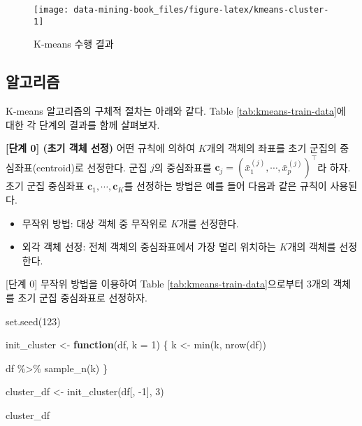\documentclass[
]{book}
\newenvironment{Shaded}{\begin{snugshade}}{\end{snugshade}}
\newcommand{\AttributeTok}[1]{\textcolor[rgb]{0.77,0.63,0.00}{#1}}
\newcommand{\ControlFlowTok}[1]{\textcolor[rgb]{0.13,0.29,0.53}{\textbf{#1}}}
\newcommand{\DecValTok}[1]{\textcolor[rgb]{0.00,0.00,0.81}{#1}}
\newcommand{\FunctionTok}[1]{\textcolor[rgb]{0.00,0.00,0.00}{#1}}
\newcommand{\NormalTok}[1]{#1}
\newcommand{\OtherTok}[1]{\textcolor[rgb]{0.56,0.35,0.01}{#1}}
\newcommand{\SpecialCharTok}[1]{\textcolor[rgb]{0.00,0.00,0.00}{#1}}
\providecommand{\tightlist}{%
  \setlength{\itemsep}{0pt}\setlength{\parskip}{0pt}}
\begin{document}
\begin{figure}

{\centering \texttt{[image: data-mining-book\_files/figure-latex/kmeans-cluster-1]} 

}

\caption{K-means 수행 결과}\label{fig:kmeans-cluster}
\end{figure}

\hypertarget{kmeans-algorithm}{%
\subsection{알고리즘}\label{kmeans-algorithm}}

K-means 알고리즘의 구체적 절차는 아래와 같다. Table \ref{tab:kmeans-train-data}에 대한 각 단계의 결과를 함께 살펴보자.

\textbf{{[}단계 0{]} (초기 객체 선정)} 어떤 규칙에 의하여 \(K\)개의 객체의 좌표를 초기 군집의 중심좌표(centroid)로 선정한다. 군집 \(j\)의 중심좌표를 \(\mathbf{c}_j = \left(\bar{x}^{(j)}_1, \cdots, \bar{x}^{(j)}_p\right)^\top\)라 하자. 초기 군집 중심좌표 \(\mathbf{c}_1, \cdots, \mathbf{c}_K\)를 선정하는 방법은 예를 들어 다음과 같은 규칙이 사용된다.

\begin{itemize}
\tightlist
\item
  무작위 방법: 대상 객체 중 무작위로 \(K\)개를 선정한다.
\item
  외각 객체 선정: 전체 객체의 중심좌표에서 가장 멀리 위치하는 \(K\)개의 객체를 선정한다.
\end{itemize}

{[}단계 0{]} 무작위 방법을 이용하여 Table \ref{tab:kmeans-train-data}으로부터 3개의 객체를 초기 군집 중심좌표로 선정하자.

\begin{Shaded}
\begin{Highlighting}[]
\FunctionTok{set.seed}\NormalTok{(}\DecValTok{123}\NormalTok{)}

\NormalTok{init\_cluster }\OtherTok{\textless{}{-}} \ControlFlowTok{function}\NormalTok{(df, }\AttributeTok{k =} \DecValTok{1}\NormalTok{) \{}
\NormalTok{  k }\OtherTok{\textless{}{-}} \FunctionTok{min}\NormalTok{(k, }\FunctionTok{nrow}\NormalTok{(df))}
  
\NormalTok{  df }\SpecialCharTok{\%\textgreater{}\%}
    \FunctionTok{sample\_n}\NormalTok{(k)}
\NormalTok{\}}

\NormalTok{cluster\_df }\OtherTok{\textless{}{-}} \FunctionTok{init\_cluster}\NormalTok{(df[, }\SpecialCharTok{{-}}\DecValTok{1}\NormalTok{], }\DecValTok{3}\NormalTok{)}

\NormalTok{cluster\_df}
\end{Highlighting}
\end{Shaded}
\end{document}
